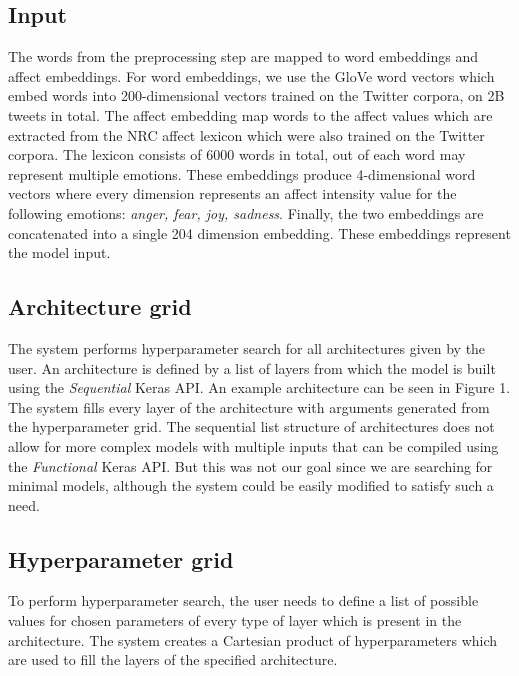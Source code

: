 \documentclass[10pt, a4paper]{article}
\begin{document}
\subsection{Input}
The words from the preprocessing step are mapped to word embeddings
and affect embeddings.
For word embeddings, we use the GloVe word vectors \citep{glove} 
which embed words into 200-dimensional vectors trained on the Twitter corpora,
on 2B tweets in total.
The affect embedding map words to the affect values which are
extracted from the NRC affect lexicon \citep{mohammed-semeval}
which were also trained on the Twitter corpora. The lexicon consists of 6000 words in total, out of each word may represent multiple emotions.
These embeddings produce 4-dimensional word vectors where every
dimension represents an affect intensity value for the following emotions: \textit{anger, fear, joy, sadness}.
Finally, the two embeddings are concatenated into a single 204 dimension embedding.
These embeddings represent the model input.

\subsection{Architecture grid}
The system performs hyperparameter search for all architectures
given by the user. 
An architecture is defined by a list of layers from which
the model is built using the \textit{Sequential} Keras API.
An example architecture can be seen in Figure 1.
The system fills every layer of the architecture with
arguments generated from the hyperparameter grid.
The sequential list structure of architectures does not
allow for more complex models with multiple inputs that can be
compiled using the \textit{Functional} Keras API.
But this was not our goal since we are searching for minimal models, 
although the system could be easily modified to satisfy such a need.

\subsection{Hyperparameter grid}
To perform hyperparameter search, the user needs to define
a list of possible values for chosen parameters of every type
of layer which is present in the architecture.
The system creates a Cartesian product of hyperparameters
which are used to fill the layers of the specified architecture.
\end{document}
